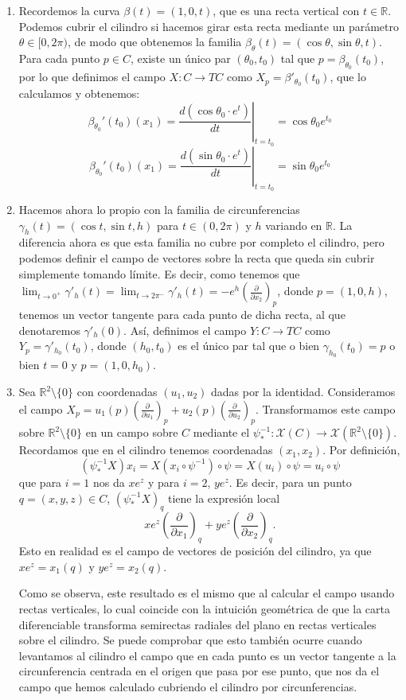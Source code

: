 \documentclass[twoside, 11pt]{article}
\theoremstyle{definition}
\newcommand{\R}{\mathbb{R}}
\newcommand{\parcial}[2]{\frac{\partial #1}{\partial #2}}
\begin{document}
\begin{enumerate}
\item
 Recordemos la curva $\beta(t)=(1,0,t)$, que es una recta vertical con $t\in\R$. Podemos cubrir el cilindro si hacemos girar esta recta mediante un parámetro $\theta\in[0,2\pi)$, de modo que obtenemos la familia $\beta_\theta(t)=(\cos\theta,\sin\theta, t)$. Para cada punto $p\in C$, existe un único par  $(\theta_0,t_0)$ tal que $p=\beta_{\theta_0}(t_0)$, por lo que definimos el campo $X:C\to TC$ como $X_p=\beta'_{\theta_0}(t_0)$, que lo calculamos y obtenemos: 
\[
\beta_{\theta_0}'(t_0)(x_1)=\left.\frac{d(\cos\theta_0\cdot e^t)}{dt}\right|_{t=t_0}=\cos\theta_0e^{t_0}
\]
\[
\beta_{\theta_0}'(t_0)(x_1)=\left.\frac{d(\sin\theta_0\cdot e^t)}{dt}\right|_{t=t_0}=\sin\theta_0e^{t_0}
\]
 
\item Hacemos ahora lo propio con la familia de circunferencias $\gamma_h(t)=(\cos t,\sin t, h)$ para $t\in (0,2\pi)$ y $h$ variando en $\R$. La diferencia ahora es que esta familia no cubre por completo el cilindro, pero podemos definir el campo de vectores sobre la recta que queda sin cubrir simplemente tomando límite. Es decir, como tenemos que $\lim_{t\to 0^+}\gamma'_h(t)=\lim_{t\to 2\pi^-}\gamma'_h(t)=-e^h\left(\parcial{}{x_2}\right)_p$, donde $p=(1,0,h)$, tenemos un vector tangente para cada punto de dicha recta, al que denotaremos $\gamma'_h(0)$. Así, definimos el campo $Y:C\to TC$ como $Y_p=\gamma'_{h_0}(t_0)$, donde $(h_0, t_0)$ es el único par tal que o bien $\gamma_{h_0}(t_0)=p$ o bien $t=0$ y $p=(1,0,h_0)$. 

\item Sea $\R^2\setminus\{0\}$ con coordenadas $(u_1,u_2)$ dadas por la identidad. Consideramos el campo $X_p=u_1(p)\left(\parcial{}{u_1}\right)_p+u_2(p)\left(\parcial{}{u_2}\right)_p$. Transformamos este campo sobre $\R^2\setminus\{0\}$ en un campo sobre $C$ mediante el $\psi^{-1}_*:\mathcal{X}(C)\to\mathcal{X}(\R^2\setminus\{0\})$. Recordamos que en el cilindro tenemos coordenadas $(x_1,x_2)$. Por definición, 
\[
(\psi^{-1}_*X)x_i=X(x_i\circ \psi^{-1})\circ \psi=X(u_i)\circ\psi =u_i\circ\psi 
\]
que para $i=1$ nos da $xe^z$ y para $i=2$, $ye^z$. Es decir, para un punto $q=(x,y,z)\in C$, $(\psi^{-1}_*X)_q$ tiene la expresión local
\[
xe^z\left(\parcial{}{x_1}\right)_q+ye^z\left(\parcial{}{x_2}\right)_q.
\]
Esto en realidad es el campo de vectores de posición del cilindro, ya que $xe^z=x_1(q)$ y $ye^z=x_2(q)$. 

Como se observa, este resultado es el mismo que al calcular el campo usando rectas verticales, lo cual coincide con la intuición geométrica de que la carta diferenciable transforma semirectas radiales del plano en rectas verticales sobre el cilindro. Se puede comprobar que esto también ocurre cuando levantamos al cilindro el campo que en cada punto es un vector tangente a la circunferencia centrada en el origen que pasa por ese punto, que nos da el campo que hemos calculado cubriendo el cilindro por circunferencias.


\end{enumerate}
\end{document}
